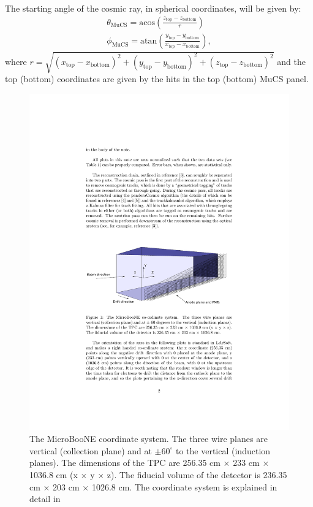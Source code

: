 \documentclass[a4paper]{scrartcl}
\begin{document}
The starting angle of the cosmic ray, in spherical coordinates, will be given by:
\begin{align}
  \theta_{\mathrm{MuCS}} = \mathrm{acos}\left(\frac{z_{\mathrm{top}}-z_{\mathrm{bottom}}}{r}\right) \\
  \phi_{\mathrm{MuCS}} = \mathrm{atan}\left(\frac{y_{\mathrm{top}}-y_{\mathrm{bottom}}}{x_{\mathrm{top}}-x_{\mathrm{bottom}}}\right),
\end{align}
where $r = \sqrt{(x_{\mathrm{top}}-x_{\mathrm{bottom}})^2+(y_{\mathrm{top}}-y_{\mathrm{bottom}})^2+(z_{\mathrm{top}}-z_{\mathrm{bottom}})^2}$ and the top (bottom) coordinates are given by the hits in the top (bottom) MuCS panel.
\begin{figure}[htbp]
  \begin{center}
    \includegraphics[width=0.8\linewidth]{figures/coord.pdf}

    \caption{The MicroBooNE coordinate system. The three wire planes are vertical (collection plane) and at  $\pm60^{\circ}$ to the vertical (induction planes). The dimensions of the TPC are 256.35 cm $\times$ 233 cm $\times$ 1036.8 cm (x $\times$ y $\times$ z). The fiducial volume of the detector is 236.35 cm $\times$ 203 cm $\times$ 1026.8 cm. The coordinate system is explained in detail in \cite{mcdata}} \label{fig:coord}
  \end{center}
\end{figure}
\end{document}
